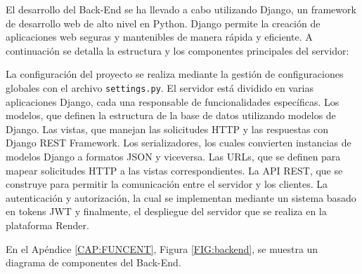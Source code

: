 El desarrollo del Back-End se ha llevado a cabo utilizando Django, un framework de desarrollo web de alto nivel en Python. Django permite la creación de aplicaciones web seguras y mantenibles de manera rápida y eficiente. A continuación se detalla la estructura y los componentes principales del servidor: 

La configuración del proyecto se realiza mediante la gestión de configuraciones globales con el archivo \texttt{settings.py}. El servidor está dividido en varias aplicaciones Django, cada una responsable de funcionalidades específicas. Los modelos, que definen la estructura de la base de datos utilizando modelos de Django. Las vistas, que manejan las solicitudes HTTP y las respuestas con Django REST Framework. Los serializadores, los cuales convierten instancias de modelos Django a formatos JSON y viceversa. Las URLs, que se definen para mapear solicitudes HTTP a las vistas correspondientes. La API REST, que se construye para permitir la comunicación entre el servidor y los clientes. La autenticación y autorización, la cual se implementan mediante un sistema basado en tokens JWT y finalmente, el despliegue del servidor que se realiza en la plataforma Render.

En el Apéndice \ref{CAP:FUNCENT}, Figura \ref{FIG:backend}, se muestra un diagrama de componentes del Back-End.
